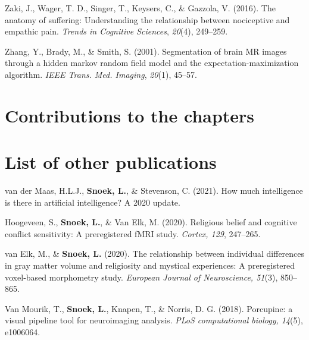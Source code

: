 \documentclass[12pt,american,a4paper,oneside,]{memoir} %
\begin{document}
\leavevmode\hypertarget{ref-zaki2016anatomy}{}%
Zaki, J., Wager, T. D., Singer, T., Keysers, C., \& Gazzola, V. (2016). The anatomy of suffering: Understanding the relationship between nociceptive and empathic pain. \emph{Trends in Cognitive Sciences}, \emph{20}(4), 249--259.

\leavevmode\hypertarget{ref-Zhang2001-wa}{}%
Zhang, Y., Brady, M., \& Smith, S. (2001). Segmentation of brain MR images through a hidden markov random field model and the expectation-maximization algorithm. \emph{IEEE Trans. Med. Imaging}, \emph{20}(1), 45--57.

\endgroup

\hypertarget{contributions-to-the-chapters}{%
\chapter*{Contributions to the chapters}\label{contributions-to-the-chapters}}

\setlength{\parindent}{0pt}
\small

\hypertarget{list-of-other-publications}{%
\chapter*{List of other publications}\label{list-of-other-publications}}


van der Maas, H.L.J., \textbf{Snoek, L.}, \& Stevenson, C. (2021). How much intelligence is there in artificial intelligence? A 2020 update.\newline

Hoogeveen, S., \textbf{Snoek, L.}, \& Van Elk, M. (2020). Religious belief and cognitive conflict sensitivity: A preregistered fMRI study. \emph{Cortex, 129}, 247--265.\newline

van Elk, M., \& \textbf{Snoek, L.} (2020). The relationship between individual differences in gray matter volume and religiosity and mystical experiences: A preregistered voxel‐based morphometry study. \emph{European Journal of Neuroscience, 51}(3), 850--865.\newline

Van Mourik, T., \textbf{Snoek, L.}, Knapen, T., \& Norris, D. G. (2018). Porcupine: a visual pipeline tool for neuroimaging analysis. \emph{PLoS computational biology, 14}(5), e1006064.\newline
\end{document}
